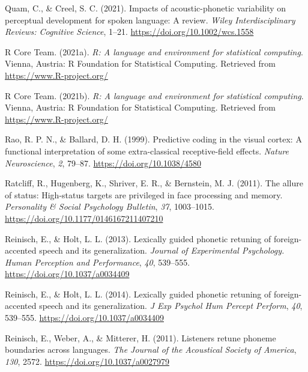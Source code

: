 \documentclass[
  11pt,
  man,floatsintext]{apa6}
\newlength{\cslhangindent}
\newlength{\cslentryspacingunit} %
\newenvironment{CSLReferences}[2] %
 {%
  \setlength{\parindent}{0pt}
  \ifodd #1
  \let\oldpar\par
  \def\par{\hangindent=\cslhangindent\oldpar}
  \fi
  \setlength{\parskip}{#2\cslentryspacingunit}
 }%
 {}
\begin{document}
\begin{CSLReferences}{1}{0}
\leavevmode{}%
Quam, C., \& Creel, S. C. (2021). Impacts of acoustic-phonetic variability on perceptual development for spoken language: A review. \emph{Wiley Interdisciplinary Reviews: Cognitive Science}, 1--21. \url{https://doi.org/10.1002/wcs.1558}

\leavevmode{}%
R Core Team. (2021a). \emph{R: A language and environment for statistical computing}. Vienna, Austria: R Foundation for Statistical Computing. Retrieved from \url{https://www.R-project.org/}

\leavevmode{}%
R Core Team. (2021b). \emph{R: A language and environment for statistical computing}. Vienna, Austria: R Foundation for Statistical Computing. Retrieved from \url{https://www.R-project.org/}

\leavevmode{}%
Rao, R. P. N., \& Ballard, D. H. (1999). Predictive coding in the visual cortex: A functional interpretation of some extra-classical receptive-field effects. \emph{Nature Neuroscience}, \emph{2}, 79--87. \url{https://doi.org/10.1038/4580}

\leavevmode{}%
Ratcliff, R., Hugenberg, K., Shriver, E. R., \& Bernstein, M. J. (2011). The allure of status: High-status targets are privileged in face processing and memory. \emph{Personality \& Social Psychology Bulletin}, \emph{37}, 1003--1015. \url{https://doi.org/10.1177/0146167211407210}

\leavevmode{}%
Reinisch, E., \& Holt, L. L. (2013). Lexically guided phonetic retuning of foreign-accented speech and its generalization. \emph{Journal of Experimental Psychology. Human Perception and Performance}, \emph{40}, 539--555. \url{https://doi.org/10.1037/a0034409}

\leavevmode{}%
Reinisch, E., \& Holt, L. L. (2014). Lexically guided phonetic retuning of foreign-accented speech and its generalization. \emph{J Exp Psychol Hum Percept Perform}, \emph{40}, 539--555. \url{https://doi.org/10.1037/a0034409}

\leavevmode{}%
Reinisch, E., Weber, A., \& Mitterer, H. (2011). Listeners retune phoneme boundaries across languages. \emph{The Journal of the Acoustical Society of America}, \emph{130}, 2572. \url{https://doi.org/10.1037/a0027979}


\end{CSLReferences}
\end{document}
